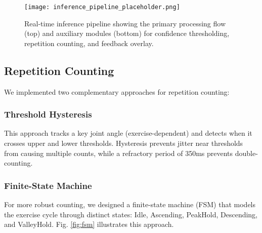 \documentclass[conference]{IEEEtran}
\begin{document}
\begin{figure}[ht]
\centering
\texttt{[image: inference\_pipeline\_placeholder.png]}
\caption{Real-time inference pipeline showing the primary processing flow (top) and auxiliary modules (bottom) for confidence thresholding, repetition counting, and feedback overlay.}
\label{fig:pipeline}
\end{figure}

\subsection{Repetition Counting}
We implemented two complementary approaches for repetition counting:

\subsubsection{Threshold Hysteresis}
This approach tracks a key joint angle (exercise-dependent) and detects when it crosses upper and lower thresholds. Hysteresis prevents jitter near thresholds from causing multiple counts, while a refractory period of 350ms prevents double-counting.

\subsubsection{Finite-State Machine}
For more robust counting, we designed a finite-state machine (FSM) that models the exercise cycle through distinct states: Idle, Ascending, PeakHold, Descending, and ValleyHold. Fig. \ref{fig:fsm} illustrates this approach.
\end{document}
